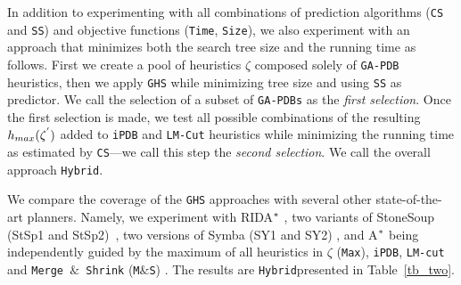In addition to experimenting with all combinations of prediction algorithms (\texttt{CS} and \texttt{SS}) and objective functions (\texttt{Time}, \texttt{Size}), we also experiment with an approach that minimizes both the search tree size and the running time as follows. First we create a pool of heuristics $\zeta$ composed solely of \texttt{GA-PDB} heuristics, then we apply \texttt{GHS} while minimizing tree size and using \texttt{SS} as predictor. We call the selection of a subset of \texttt{GA-PDBs} as the \textit{first selection}. Once the first selection is made, we test all possible combinations of the resulting $h_{max}(\zeta\sp{'})$ added to \texttt{iPDB} and \texttt{LM-Cut} heuristics while minimizing the running time as estimated by \texttt{CS}---we call this step the \textit{second selection}. We call the overall approach \texttt{Hybrid}.


We compare the coverage of the \texttt{GHS} approaches with several other state-of-the-art planners. Namely, we experiment with RIDA$\sp{*}$ \cite{BarleySantiagoOver}, two variants of StoneSoup (StSp1 and StSp2)~\cite{HelmertRK11}, two versions of Symba (SY1 and SY2) \cite{torralba2015phd}, and A$\sp{*}$ being independently guided by the maximum of all heuristics in $\zeta$ (\texttt{Max}), \texttt{iPDB}, \texttt{LM-cut} and \texttt{Merge $\&$ Shrink} (\texttt{M$\&$S}) \cite{nissim2011computing}. The results are \texttt{Hybrid}presented in Table~\ref{tb_two}.


